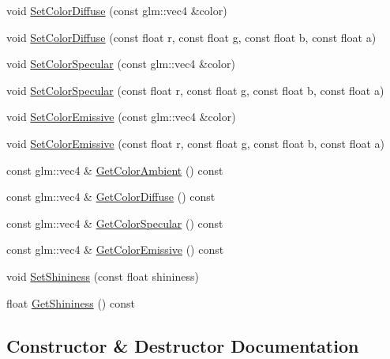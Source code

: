 \begin{DoxyCompactItemize}
\item 
void \mbox{\hyperlink{classngl_1_1_material_a8086acfca809cb74fee5cef4348e6f97}{Set\+Color\+Diffuse}} (const glm\+::vec4 \&color)
\item 
void \mbox{\hyperlink{classngl_1_1_material_aa0fbefc39b5a90677aef7b13362687d0}{Set\+Color\+Diffuse}} (const float r, const float g, const float b, const float a)
\item 
void \mbox{\hyperlink{classngl_1_1_material_a548c2f56f44e0f762a87a0c2c50117f6}{Set\+Color\+Specular}} (const glm\+::vec4 \&color)
\item 
void \mbox{\hyperlink{classngl_1_1_material_a3915a8e436cb8231ac44f8368a7a8013}{Set\+Color\+Specular}} (const float r, const float g, const float b, const float a)
\item 
void \mbox{\hyperlink{classngl_1_1_material_af2299da5c55bb6c8650b255ac3677062}{Set\+Color\+Emissive}} (const glm\+::vec4 \&color)
\item 
void \mbox{\hyperlink{classngl_1_1_material_ad1e67b68a859bd6978151124b5e6db57}{Set\+Color\+Emissive}} (const float r, const float g, const float b, const float a)
\item 
const glm\+::vec4 \& \mbox{\hyperlink{classngl_1_1_material_a56f725cae9319ced376fa7dc5019a265}{Get\+Color\+Ambient}} () const
\item 
const glm\+::vec4 \& \mbox{\hyperlink{classngl_1_1_material_a816843cb74cd2cfd3d08f9c6c8640818}{Get\+Color\+Diffuse}} () const
\item 
const glm\+::vec4 \& \mbox{\hyperlink{classngl_1_1_material_aeebd1ebcfd6254bb9a71dd4fb561a94b}{Get\+Color\+Specular}} () const
\item 
const glm\+::vec4 \& \mbox{\hyperlink{classngl_1_1_material_aa2ab47664318d52d179ba2cdbbe19bfe}{Get\+Color\+Emissive}} () const
\item 
void \mbox{\hyperlink{classngl_1_1_material_a45ac582dba49a57f1824145fb80d472b}{Set\+Shininess}} (const float shininess)
\item 
float \mbox{\hyperlink{classngl_1_1_material_acbb0be410c02db29c096e078ea3d94a1}{Get\+Shininess}} () const
\end{DoxyCompactItemize}


\subsection{Constructor \& Destructor Documentation}
\mbox{\label{classngl_1_1_material_a3a1d6baa46095dec622f60884bd8bcf3}} 

